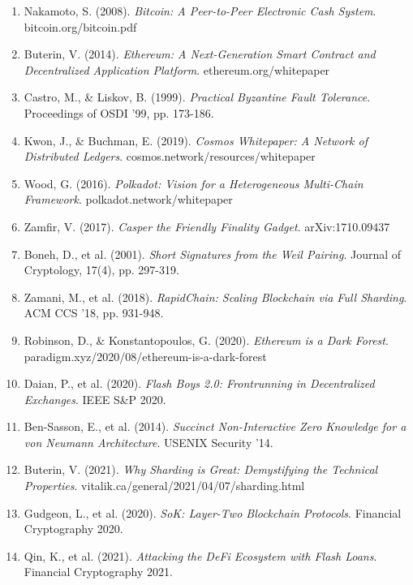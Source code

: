 \documentclass[12pt,a4paper]{article}
\begin{document}
\begin{enumerate}
    \item Nakamoto, S. (2008). \textit{Bitcoin: A Peer-to-Peer Electronic Cash System}. bitcoin.org/bitcoin.pdf

    \item Buterin, V. (2014). \textit{Ethereum: A Next-Generation Smart Contract and Decentralized Application Platform}. ethereum.org/whitepaper

    \item Castro, M., \& Liskov, B. (1999). \textit{Practical Byzantine Fault Tolerance}. Proceedings of OSDI '99, pp. 173-186.

    \item Kwon, J., \& Buchman, E. (2019). \textit{Cosmos Whitepaper: A Network of Distributed Ledgers}. cosmos.network/resources/whitepaper

    \item Wood, G. (2016). \textit{Polkadot: Vision for a Heterogeneous Multi-Chain Framework}. polkadot.network/whitepaper

    \item Zamfir, V. (2017). \textit{Casper the Friendly Finality Gadget}. arXiv:1710.09437

    \item Boneh, D., et al. (2001). \textit{Short Signatures from the Weil Pairing}. Journal of Cryptology, 17(4), pp. 297-319.

    \item Zamani, M., et al. (2018). \textit{RapidChain: Scaling Blockchain via Full Sharding}. ACM CCS '18, pp. 931-948.

    \item Robinson, D., \& Konstantopoulos, G. (2020). \textit{Ethereum is a Dark Forest}. paradigm.xyz/2020/08/ethereum-is-a-dark-forest

    \item Daian, P., et al. (2020). \textit{Flash Boys 2.0: Frontrunning in Decentralized Exchanges}. IEEE S\&P 2020.

    \item Ben-Sasson, E., et al. (2014). \textit{Succinct Non-Interactive Zero Knowledge for a von Neumann Architecture}. USENIX Security '14.

    \item Buterin, V. (2021). \textit{Why Sharding is Great: Demystifying the Technical Properties}. vitalik.ca/general/2021/04/07/sharding.html

    \item Gudgeon, L., et al. (2020). \textit{SoK: Layer-Two Blockchain Protocols}. Financial Cryptography 2020.

    \item Qin, K., et al. (2021). \textit{Attacking the DeFi Ecosystem with Flash Loans}. Financial Cryptography 2021.
\end{enumerate}
\end{document}
